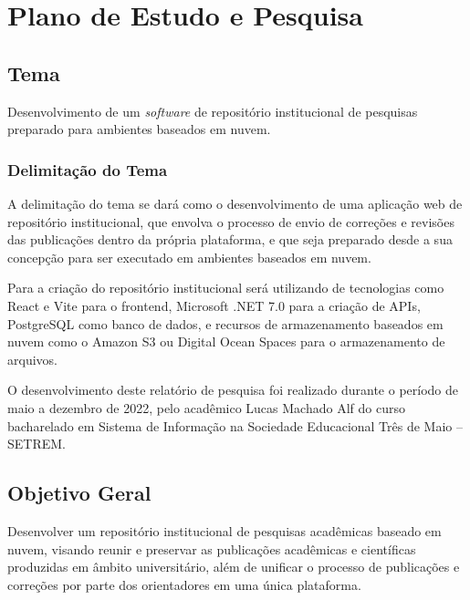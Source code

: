 \chapter{Plano de Estudo e Pesquisa} \label{chap:ResearchPlan}

\section{Tema} \label{sec::Theme}
Desenvolvimento de um \emph{software} de repositório institucional de
pesquisas preparado para ambientes baseados em nuvem.

\subsection{Delimitação do Tema} \label{subsec::ThemeDelimitation}

A delimitação do tema se dará como o desenvolvimento de uma aplicação
web de repositório institucional, que envolva o processo de envio
de correções e revisões das publicações dentro da própria plataforma,
e que seja preparado desde a sua concepção para ser executado em ambientes
baseados em nuvem.

Para a criação do repositório institucional será utilizando de tecnologias
como React e Vite para o frontend, Microsoft .NET 7.0 para a criação
de APIs, PostgreSQL como banco de dados, e recursos de armazenamento baseados em
nuvem como o Amazon S3 ou Digital Ocean Spaces para o armazenamento de arquivos.

O desenvolvimento deste relatório de pesquisa foi realizado durante o período de
maio a dezembro de 2022, pelo acadêmico Lucas Machado Alf do curso bacharelado
em Sistema de Informação na Sociedade Educacional Três de Maio – SETREM.

\section{Objetivo Geral} \label{sec:objective}

Desenvolver um repositório institucional de pesquisas acadêmicas
baseado em nuvem, visando reunir e preservar as publicações acadêmicas
e científicas produzidas em âmbito universitário, além de unificar o processo
de publicações e correções por parte dos orientadores em uma única plataforma.


